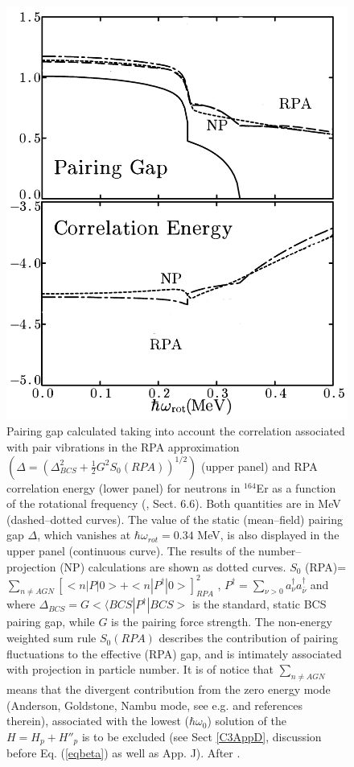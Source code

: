   \begin{figure}
  \centerline{\includegraphics*[width=\textwidth,angle=0]{nutshell/figs/fig1_1_2.pdf}}
  \caption{Pairing gap calculated taking into account the correlation associated with pair vibrations in the RPA approximation $(\Delta=(\Delta^2_{BCS}+\tfrac{1}{2}G^2S_0(RPA))^{1/2})$ (upper panel) and RPA correlation energy (lower panel) for neutrons in $^{164}$Er as a function of the rotational frequency (\cite{Brink:05}, Sect. 6.6). Both quantities are in MeV (dashed--dotted curves). The value of the static (mean--field) pairing gap $\Delta$, which vanishes at $\hbar \omega_{rot}=0.34 $ MeV, is also displayed in the upper panel (continuous curve). The results of the number--projection (NP) calculations are shown as dotted curves.  $S_0$ (RPA)= $\sum_{n \neq AGN} \left[<n|P |0>  + <n|P^{\dagger} |0>\right]^2_{RPA}$ , $P^\dagger=\sum_{\nu>0}a^\dagger_\nu a^\dagger_{\bar \nu}$ and
    where \mbox{$\Delta_{BCS} = G<⟨BCS|P^{\dagger}|BCS>$} is the standard, static BCS pairing gap,
    while $G$ is the pairing force strength. The non-energy weighted sum rule $S_0 (RPA)$
    describes the contribution of pairing fluctuations to the effective (RPA) gap,
    and is intimately associated with projection in particle number. It is of notice
    that $\sum_{n \neq AGN}$ means that the divergent contribution from the zero energy mode
    (Anderson, Goldstone, Nambu mode, see e.g. \cite{Broglia:00} and references therein), associated with the lowest ($\hbar \omega_0$) solution
    of the $H=H_{p}+H''_p$ is to be excluded (see Sect \ref{C3AppD}, discussion before Eq. (\ref{eqbeta}) as well as \cite{Brink:05} App. J). After \cite{Shimizu:90}.}\label{fig1.2}
  \end{figure}
  
